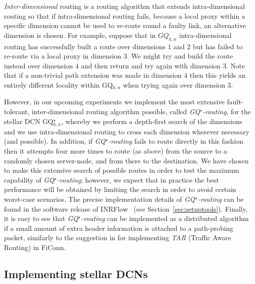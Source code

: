 \documentclass[]{amsart}
\newcommand\snapflow{INRFlow}
\begin{document}
\emph{Inter-dimensional\/} routing is a routing algorithm that extends intra-dimensional routing so that if intra-dimensional routing fails, because a local proxy within a specific dimension cannot be used to re-route round a faulty link, an alternative dimension is chosen. For example, suppose that in $GQ_{k,n}$ intra-dimensional routing has successfully built a route over dimensions $1$ and $2$ but has failed to re-route via a local proxy
in dimension $3$. We might try and build the route instead over dimension $4$ and then return and try again with dimension $3$. Note that if a non-trivial path extension was made in dimension $4$ then this yields an entirely different locality within GQ$_{k,n}$ when trying again over dimension $3$.

However, in our upcoming experiments we implement the most extensive fault-tolerant, inter-dimensional
routing algorithm possible, called \emph{GQ$^\star$-routing\/}, for the stellar DCN GQ$^\star_{k,n}$,
whereby we perform a depth-first search of the dimensions and we use
intra-dimensional routing to cross each dimension wherever necessary
(and possible).  In addition, if \emph{GQ$^\star$-routing\/} fails to route
directly in this fashion then it attempts four more times to route (as
above) from the source to a randomly chosen server-node, and from there to
the destination.  We have chosen to make this extensive search of
possible routes in order to test the maximum capability of
\emph{GQ$^\star$-routing\/}; however, we expect that in practice the best
performance will be obtained by limiting the search in order to avoid
certain worst-case scenarios. The precise implementation details of \emph{GQ$^\star$-routing\/} can be found in the software release of \snapflow\ \cite{TEF} (see Section~\ref{sec:setuptools}). Finally, it is easy to see that \emph{GQ$^\star$-routing\/} can be implemented as a  distributed algorithm if a small amount of extra header information is attached to a path-probing packet, similarly to the suggestion in \cite{LiGuoWu2011} for implementing \emph{TAR\/} (Traffic Aware Routing) in FiConn.

\subsection{Implementing stellar DCNs}
\label{sec:implementing}
\end{document}
